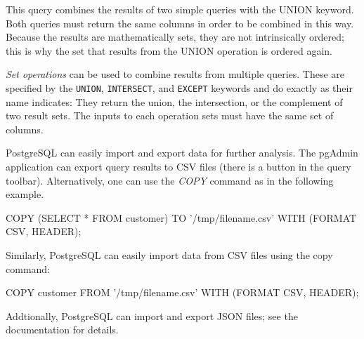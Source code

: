 This query combines the results of two simple queries with the UNION keyword. Both queries must return the same columns in order to be combined in this way. Because the results are mathematically sets, they are not intrinsically ordered; this is why the set that results from the UNION operation is ordered again.

\emph{Set operations} can be used to combine results from multiple queries. These are specified by the \texttt{UNION}, \texttt{INTERSECT}, and \texttt{EXCEPT} keywords and do exactly as their name indicates: They return the union, the intersection, or the complement of two result sets. The inputs to each operation sets must have the same set of columns.

PostgreSQL can easily import and export data for further analysis. The pgAdmin application can export query results to CSV files (there is a button in the query toolbar). Alternatively, one can use the \emph{COPY} command as in the following example.

\begin{samepage}
\begin{sqlcode}
COPY (SELECT * FROM customer) 
  TO '/tmp/filename.csv' 
  WITH (FORMAT CSV, HEADER);
\end{sqlcode}
\end{samepage}

Similarly, PostgreSQL can easily import data from CSV files using the copy command:

\begin{samepage}
\begin{sqlcode}
COPY customer 
  FROM '/tmp/filename.csv' 
  WITH (FORMAT CSV, HEADER);
\end{sqlcode}
\end{samepage}

Addtionally, PostgreSQL can import and export JSON files; see the documentation for details.

